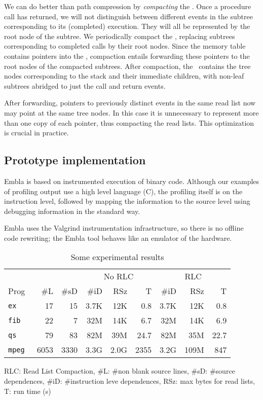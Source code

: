 \documentclass[times, 10pt,twocolumn]{article}
\begin{document}
We can do better than path compression by {\em compacting} the \tracepile. 
Once a procedure call has returned, we will not distinguish between 
different events in the subtree corresponding to its (completed) 
execution. They will all be represented by the root node of the subtree.
We periodically compact the \tracepile, replacing subtrees
corresponding to completed calls by their root nodes. Since the 
memory table contains pointers into the \tracepile, compaction
entails forwarding these pointers to the root nodes of the compacted 
subtrees.
After compaction, the \tracepile\ contains the
tree nodes corresponding to the stack and their immediate children,
with non-leaf subtrees abridged to just the call and return events.

After forwarding, pointers to previously distinct events in the same read list 
now may point at the same 
tree nodes. In this case it is unnecessary to represent more than one 
copy of each pointer, thus compacting the read lists. This optimization is 
crucial in practice.

\subsection{Prototype implementation}

Embla is based on instrumented execution of binary code. Although
our examples of profiling output use a high level language (C),
the profiling itself is on the instruction level, followed by 
mapping the information to the source level using debugging information 
in the standard way.

Embla uses the Valgrind instrumentation infrastructure, so there
is no offline code rewriting; the Embla tool behaves like an emulator
of the hardware.



\begin{table}
\begin{center} \newcommand{\sms}{\hskip0.4em}
\begin{tabular}{|@{\sms}l@{\sms}|r@{\sms}r|r@{\sms}r@{\sms}r|r@{\sms}r@{\sms}r|} \hline
 & & & \multicolumn{3}{|c|}{No RLC} & 
\multicolumn{3}{c|}{RLC} \\
Prog & \#L & \#sD & \#iD & RSz & T 
                              & \#iD & RSz & T \\ \hline
\tt ex & 17 & 15 & 3.7K & 12K & 0.8 & 3.7K & 12K & 0.8 \\
\tt fib & 22 & 7 & 32M & 14K & 6.7 & 32M & 14K & 6.9 \\
\tt qs & 79 & 83 & 82M & 39M & 24.7 & 82M & 35M & 22.7 \\
\tt mpeg & 6053 & 3330 & 3.3G & 2.0G & 2355 & 3.2G & 109M & 847 \\ \hline
\end{tabular}
\end{center}
RLC: Read List Compaction, 
\#L: \#non blank source lines, \#sD: \#source dependences, \#iD: 
\#instruction
leve dependences, RSz: max bytes for read lists, T: run time (s)
\caption{Some experimental results} \label{trex}
\end{table}
\end{document}
